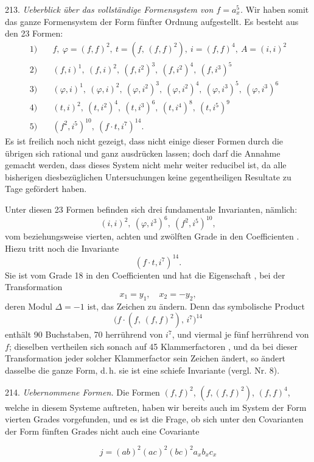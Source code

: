 \documentclass[11pt]{article}
\providecommand{\weberpage}[1]{}
\providecommand{\weq}[2]{\begin{equation}\tag{#1}#2\end{equation}}
\let\Delta\varDelta
\begin{document}
213. \textit{Ueberblick \"uber das vollst\"andige Formensystem von $f = a_x^5$.}
Wir haben somit das ganze Formensystem der Form f\"unfter Ordnung
aufgestellt. Es besteht aus den 23 Formen:
\[
\begin{aligned}
1) &\quad f,\ \varphi = (f,f)^2,\ t = (f,\,(f,f)^2),\ i = (f,f)^4,\ A = (i,i)^2 \\
2) &\quad (f,i)^1,\ (f,i)^2,\ (f,i^2)^3,\ (f,i^2)^4,\ (f,i^3)^5 \\
3) &\quad (\varphi,i)^1,\ (\varphi,i)^2,\ (\varphi,i^2)^3,\ (\varphi,i^2)^4,\ (\varphi,i^3)^5,\ (\varphi,i^3)^6 \\
4) &\quad (t,i)^2,\ (t,i^2)^4,\ (t,i^3)^6,\ (t,i^4)^8,\ (t,i^5)^9 \\
5) &\quad (f^2,i^5)^{10},\ (f \cdot t, i^7)^{14}.
\end{aligned}
\]
Es ist freilich noch nicht gezeigt, dass nicht einige dieser Formen
durch die \"ubrigen sich rational und ganz ausdr\"ucken lassen; doch
darf die Annahme gemacht werden, dass dieses System nicht mehr
weiter reducibel ist, da alle bisherigen diesbez\"uglichen Untersuchungen
keine gegentheiligen Resultate zu Tage gef\"ordert haben.

Unter diesen 23 Formen befinden sich drei fundamentale Invarianten,
n\"amlich:
\[
(i,i)^2,\ (\varphi, i^3)^6,\ (f^2, i^5)^{10},
\]
vom beziehungsweise vierten, achten und zw\"olften Grade in den Coefficienten
. Hiezu tritt noch die Invariante
\[
(f \cdot t, i^7)^{14}.
\]
Sie ist vom Grade 18 in den Coefficienten und hat die Eigenschaft
, bei der Transformation
\[
x_1 = y_1,\quad x_2 = -y_2,
\]
deren Modul $\Delta = -1$ ist, das Zeichen zu \"andern. Denn das symbolische
 Product
\[
\bigl(f \cdot (f,\,(f,f)^2),\, i^7\bigr)^{14}
\]
enth\"alt 90 Buchstaben, 70 herr\"uhrend von $i^7$, und viermal je f\"unf
herr\"uhrend von $f$; dieselben vertheilen sich sonach auf 45 Klammerfactoren
, und da bei dieser Transformation jeder solcher Klammerfactor
sein Zeichen \"andert, so \"andert dasselbe die ganze Form, d.\,h. sie ist
eine \glqq schiefe Invariante\grqq{} (vergl. Nr. 8).


\weberpage{241}

214. \textit{Uebernommene Formen.} Die Formen $(f, f)^2$, $(f, (f, f)^2)$,
$(f, f)^4$, welche in diesem Systeme auftreten, haben wir bereits auch
im System der Form vierten Grades vorgefunden, und es ist die Frage,
ob sich unter den Covarianten der Form fünften Grades nicht auch
eine Covariante

\weq{1}{j = (ab)^2 (ac)^2 (bc)^2 a_x b_x c_x}
\end{document}
